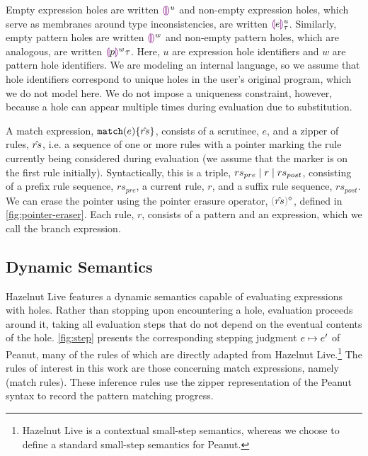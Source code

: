 Empty expression holes are written $\textcolor{violet}{\llparenthesis}\textcolor{violet}{\rrparenthesis}^{u}$ and non-empty expression holes, which serve as membranes around type inconsistencies, are written $\textcolor{violet}{\llparenthesis} e\textcolor{violet}{\rrparenthesis}^{u}_{\tau}$. Similarly, empty pattern holes are written $\textcolor{violet}{\llparenthesis}\textcolor{violet}{\rrparenthesis}^{w}$ and non-empty pattern holes, which are analogous, are written $\textcolor{violet}{\llparenthesis} p\textcolor{violet}{\rrparenthesis}^{w}{\tau}$. Here, $u$ are expression hole identifiers and $w$ are pattern hole identifiers.
We are modeling an internal language, so we assume that hole identifiers 
correspond to unique holes in the user's original program, which we do not model here. We do not impose a uniqueness constraint, however, because a hole can 
appear multiple times during evaluation due to substitution.

A match expression, $\mathtt{match}(e) \{\hat{rs}\}$, 
consists of a scrutinee, $e$, and a zipper of rules, $\hat{rs}$, i.e. a sequence of one or more rules with a pointer marking the rule currently being considered during evaluation (we assume that the marker is on the first rule initially). Syntactically, this is a triple, $rs_{pre} \mid r \mid rs_{post}$, consisting of a prefix rule sequence, $rs_{pre}$, a current rule, $r$, and a suffix rule sequence, $rs_{post}$. We can erase the pointer using the pointer erasure operator, $\rmpointer{\zrules}$, defined in \autoref{fig:pointer-eraser}. 
Each rule, $r$, consists of a pattern and an expression, which we call the branch expression.



\subsection{Dynamic Semantics}\label{sec:dynamics}




Hazelnut Live \cite{DBLP:journals/pacmpl/OmarVCH19} features a dynamic semantics capable of evaluating expressions with holes.
Rather than stopping upon encountering a hole, evaluation proceeds around it, taking all evaluation steps that do not depend on the eventual contents of the hole.
\autoref{fig:step} presents the corresponding stepping judgment $e \mapsto e'$ of Peanut, many of the rules of which are directly adapted from Hazelnut Live.\footnote{Hazelnut Live is a contextual small-step semantics, whereas we choose to define a standard small-step semantics for Peanut.}
The rules of interest in this work are those concerning match expressions, namely (match rules\todo{}).
These inference rules use the zipper representation of the Peanut syntax to record the pattern matching progress.

